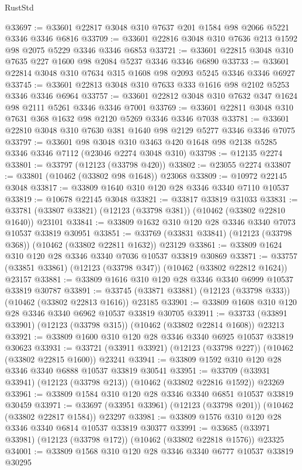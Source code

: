 \begin{lexlean}{RustStd}
\begin{coremodule}
@33697 := @33601 @22817 @3048 @310 @7637 @201 @1584 @98 @2066 @5221 @3346 @3346 @6816
@33709 := @33601 @22816 @3048 @310 @7636 @213 @1592 @98 @2075 @5229 @3346 @3346 @6853
@33721 := @33601 @22815 @3048 @310 @7635 @227 @1600 @98 @2084 @5237 @3346 @3346 @6890
@33733 := @33601 @22814 @3048 @310 @7634 @315 @1608 @98 @2093 @5245 @3346 @3346 @6927
@33745 := @33601 @22813 @3048 @310 @7633 @333 @1616 @98 @2102 @5253 @3346 @3346 @6964
@33757 := @33601 @22812 @3048 @310 @7632 @347 @1624 @98 @2111 @5261 @3346 @3346 @7001
@33769 := @33601 @22811 @3048 @310 @7631 @368 @1632 @98 @2120 @5269 @3346 @3346 @7038
@33781 := @33601 @22810 @3048 @310 @7630 @381 @1640 @98 @2129 @5277 @3346 @3346 @7075
@33797 := @33601
    @98
    @3048
    @310
    @3463
    @420
    @1648
    @98
    @2138
    @5285
    @3346
    @3346
    @7112
    (@23046 @2274 @3048 @310)
@33798 := @12135 @2274
@33801 := @33797 (@12123 (@33798 @420))
@33802 := @23055 @2274
@33807 := @33801 (@10462 (@33802 @98 @1648)) @23068
@33809 := @10972 @22145 @3048
@33817 := @33809 @1640 @310 @120 @28 @3346 @3340 @7110 @10537
@33819 := @10678 @22145 @3048
@33821 := @33817 @33819 @31033
@33831 := @33781 (@33807 @33821) (@12123 (@33798 @381)) (@10462 (@33802 @22810 @1640)) @23101
@33841 := @33809 @1632 @310 @120 @28 @3346 @3340 @7073 @10537 @33819 @30951
@33851 := @33769 (@33831 @33841) (@12123 (@33798 @368)) (@10462 (@33802 @22811 @1632)) @23129
@33861 := @33809 @1624 @310 @120 @28 @3346 @3340 @7036 @10537 @33819 @30869
@33871 := @33757 (@33851 @33861) (@12123 (@33798 @347)) (@10462 (@33802 @22812 @1624)) @23157
@33881 := @33809 @1616 @310 @120 @28 @3346 @3340 @6999 @10537 @33819 @30787
@33891 := @33745 (@33871 @33881) (@12123 (@33798 @333)) (@10462 (@33802 @22813 @1616)) @23185
@33901 := @33809 @1608 @310 @120 @28 @3346 @3340 @6962 @10537 @33819 @30705
@33911 := @33733 (@33891 @33901) (@12123 (@33798 @315)) (@10462 (@33802 @22814 @1608)) @23213
@33921 := @33809 @1600 @310 @120 @28 @3346 @3340 @6925 @10537 @33819 @30623
@33931 := @33721 (@33911 @33921) (@12123 (@33798 @227)) (@10462 (@33802 @22815 @1600)) @23241
@33941 := @33809 @1592 @310 @120 @28 @3346 @3340 @6888 @10537 @33819 @30541
@33951 := @33709 (@33931 @33941) (@12123 (@33798 @213)) (@10462 (@33802 @22816 @1592)) @23269
@33961 := @33809 @1584 @310 @120 @28 @3346 @3340 @6851 @10537 @33819 @30459
@33971 := @33697 (@33951 @33961) (@12123 (@33798 @201)) (@10462 (@33802 @22817 @1584)) @23297
@33981 := @33809 @1576 @310 @120 @28 @3346 @3340 @6814 @10537 @33819 @30377
@33991 := @33685 (@33971 @33981) (@12123 (@33798 @172)) (@10462 (@33802 @22818 @1576)) @23325
@34001 := @33809 @1568 @310 @120 @28 @3346 @3340 @6777 @10537 @33819 @30295

\end{coremodule}
\end{lexlean}
